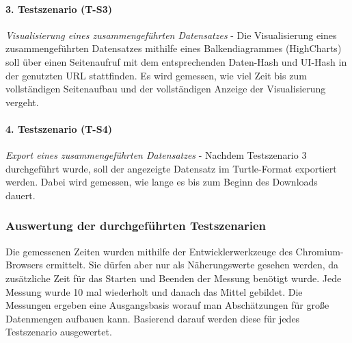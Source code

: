 \documentclass[11pt]{article}
\newcommand{\com}[1]{\marginpar{\em {\small{#1}}}} %
\begin{document}
\paragraph{3. Testszenario (T-S3)} \textit{Visualisierung eines zusammengeführten Datensatzes}\com{T-S3} - Die Visualisierung eines zusammengeführten Datensatzes mithilfe eines Balkendiagrammes (HighCharts) soll über einen Seitenaufruf mit dem entsprechenden Daten-Hash und UI-Hash in der genutzten URL stattfinden. Es wird gemessen, wie viel Zeit bis zum vollständigen Seitenaufbau und der vollständigen Anzeige der Visualisierung vergeht.
    

\paragraph{4. Testszenario (T-S4)} \textit{Export eines zusammengeführten Datensatzes}\com{T-S4} - Nachdem Testszenario 3 durchgeführt wurde, soll der angezeigte Datensatz im Turtle-Format exportiert werden. Dabei wird gemessen, wie lange es bis zum Beginn des Downloads dauert. \\



%
%
%
\subsubsection{Auswertung der durchgeführten Testszenarien}

Die gemessenen Zeiten wurden mithilfe der Entwicklerwerkzeuge des Chromium-Browsers ermittelt. Sie dürfen aber nur als Näherungswerte gesehen werden, da zusätzliche Zeit für das Starten und Beenden der Messung benötigt wurde. Jede Messung wurde 10 mal wiederholt und danach das Mittel gebildet. Die Messungen ergeben eine Ausgangsbasis worauf man Abschätzungen für große Datenmengen aufbauen kann. Basierend darauf werden diese für jedes Testszenario ausgewertet.
\end{document}
